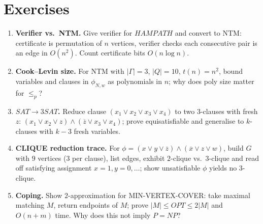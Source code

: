 \section{Exercises}
\label{sec:ch08-exercises}
\begin{enumerate}[label=E8.\arabic*, leftmargin=*, itemsep=0.8em]
\item \textbf{Verifier vs.\ NTM.} Give verifier for $HAMPATH$ and convert to NTM: certificate is permutation of $n$ vertices, verifier checks each consecutive pair is an edge in $O(n^2)$. Count certificate bits $O(n\log n)$.
\item \textbf{Cook--Levin size.} For NTM with $|\Gamma|=3$, $|Q|=10$, $t(n)=n^2$, bound variables and clauses in $\phi_{N,w}$ as polynomials in $n$; why does poly size matter for $\le_p$?
\item \textbf{$SAT\to3SAT$.} Reduce clause $(x_1\lor x_2\lor x_3\lor x_4)$ to two $3$-clauses with fresh $z$: $(x_1\lor x_2\lor z)\land(\overline{z}\lor x_3\lor x_4)$; prove equisatisfiable and generalise to $k$-clauses with $k-3$ fresh variables.
\item \textbf{CLIQUE reduction trace.} For $\phi=(x\lor y\lor\overline{z})\land(\overline{x}\lor z\lor w)$, build $G$ with $9$ vertices (3 per clause), list edges, exhibit $2$-clique vs.\ $3$-clique and read off satisfying assignment $x=1,y=0,\dots$; show unsatisfiable $\phi$ yields no $3$-clique.
\item \textbf{Coping.} Show $2$-approximation for MIN-VERTEX-COVER: take maximal matching $M$, return endpoints of $M$; prove $|M|\le OPT\le2|M|$ and $O(n+m)$ time. Why does this not imply $P=NP$?
\end{enumerate}
